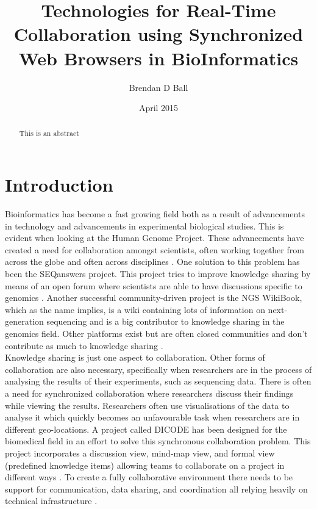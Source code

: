\documentclass[prodmode,acmtecs]{acmsmall}
\begin{document}

\title{Technologies for Real-Time Collaboration using Synchronized Web Browsers in BioInformatics} %
\author{Brendan D Ball
}
\date{April 2015}

\begin{abstract}
This is an abstract
\end{abstract}

\maketitle
\section{Introduction}

Bioinformatics has become a fast growing field both as a result of advancements in technology and advancements in experimental biological studies. This is evident when looking at the Human Genome Project. These advancements have created a need for collaboration amongst scientists, often working together from across the globe and often across disciplines \cite{li2013ngs,lee2007facilitating,tsiliki2014datamining}. One solution to this problem has been the SEQanswers project. This project tries to improve knowledge sharing by means of an open forum where scientists are able to have discussions specific to genomics \cite{li2012seqanswers}. Another successful community-driven project is the NGS WikiBook, which as the name implies, is a wiki containing lots of information on next-generation sequencing and is a big contributor to knowledge sharing in the genomics field. Other platforms exist but are often closed communities and don't contribute as much to knowledge sharing \cite{li2013ngs}.\\

Knowledge sharing is just one aspect to collaboration. Other forms of collaboration are also necessary, specifically when researchers are in the process of analysing the results of their experiments, such as sequencing data. There is often a need for synchronized collaboration where researchers discuss their findings while viewing the results. Researchers often use visualisations of the data to analyse it which quickly becomes an unfavourable task when researchers are in different geo-locations. A project called DICODE has been designed for the biomedical field in an effort to solve this synchronous collaboration problem. This project incorporates a discussion view, mind-map view, and formal view (predefined knowledge items) allowing teams to collaborate on a project in different ways \cite{karacapilidis2011facilitating}. To create a fully collaborative environment there needs to be support for communication, data sharing, and coordination all relying heavily on technical infrastructure \cite{lee2007facilitating}.\\
\end{document}
